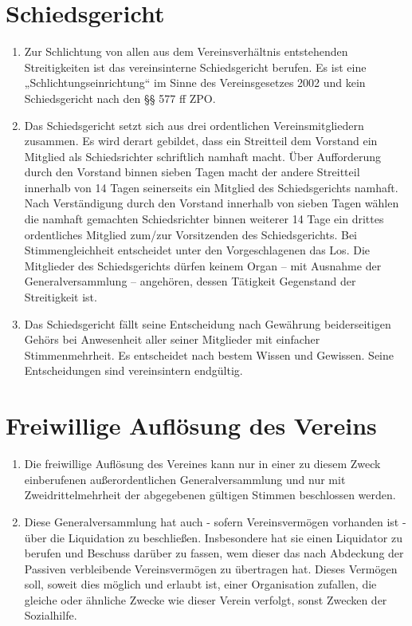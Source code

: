 \documentclass[a4paper,12pt]{article}
\newcommand{\comment}[1]{{\bf /*Komm.:} \textit{#1} {\bf */}}
\def\comment#1{}
\begin{document}
\section{Schiedsgericht} %
\begin{enumerate}

\item Zur Schlichtung von allen aus dem Vereinsverhältnis entstehenden Streitigkeiten ist das vereinsinterne Schiedsgericht berufen. Es ist eine „Schlichtungseinrichtung“ im Sinne des Vereinsgesetzes 2002 und kein Schiedsgericht nach den §§ 577 ff ZPO.

\item Das Schiedsgericht setzt sich aus drei ordentlichen Vereinsmitgliedern zusammen.
Es wird derart gebildet, dass ein Streitteil dem Vorstand ein Mitglied als Schiedsrichter schriftlich namhaft macht.
Über Aufforderung durch den Vorstand binnen sieben Tagen macht der andere Streitteil innerhalb von 14 Tagen seinerseits ein Mitglied des Schiedsgerichts namhaft.
Nach Verständigung durch den Vorstand innerhalb von sieben Tagen wählen die namhaft gemachten Schiedsrichter binnen weiterer 14 Tage ein drittes ordentliches Mitglied zum/zur Vorsitzenden des Schiedsgerichts.
Bei Stimmengleichheit entscheidet unter den Vorgeschlagenen das Los. Die Mitglieder des Schiedsgerichts dürfen keinem Organ – mit Ausnahme der Generalversammlung – angehören, dessen Tätigkeit Gegenstand der Streitigkeit ist.

\item Das Schiedsgericht fällt seine Entscheidung nach Gewährung beiderseitigen Gehörs bei Anwesenheit aller seiner Mitglieder mit einfacher Stimmenmehrheit.
Es entscheidet nach bestem Wissen und Gewissen. Seine Entscheidungen sind vereinsintern endgültig.

\end{enumerate}

\section{Freiwillige Auflösung des Vereins} %
\comment{Bedingt zweidrittel Mehrheit in ausserordentlicher GV; d. Vereinsvermögen wird (an andere ähnliche oder mildtätige Vereine)  weitergegeben}
\begin{enumerate}
\item Die freiwillige Auflösung des Vereines kann nur in einer zu diesem Zweck einberufenen außerordentlichen Generalversammlung und nur mit Zweidrittelmehrheit der abgegebenen gültigen Stimmen beschlossen werden.
\item Diese Generalversammlung hat auch - sofern Vereinsvermögen vorhanden ist - über die Liquidation zu beschließen. Insbesondere hat sie einen Liquidator zu berufen und Beschuss darüber zu fassen, wem dieser das nach Abdeckung der Passiven verbleibende Vereinsvermögen zu übertragen hat.
Dieses Vermögen soll, soweit dies möglich und erlaubt ist, einer Organisation zufallen, die gleiche oder ähnliche Zwecke wie dieser Verein verfolgt, sonst Zwecken der Sozialhilfe.
\comment{Letzter Satz wieder wie im BMI orig}

\end{enumerate}
\end{document}
